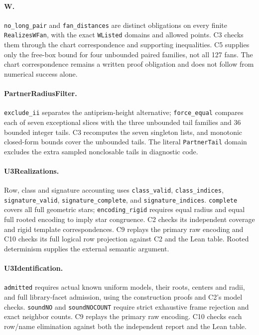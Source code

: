 \documentclass[11pt]{article}
\theoremstyle{definition}
\theoremstyle{remark}
\begin{document}
\paragraph{W.}
\texttt{no\_long\_pair} and \texttt{fan\_distances} are distinct
obligations on every finite \texttt{RealizesWFan}, with the exact
\texttt{WListed} domains and allowed points. C3 checks them through the
chart correspondence and supporting inequalities. C5 supplies only the
free-box bound for four unbounded paired families, not all 127 fans.
The chart correspondence remains a written proof obligation and does not
follow from numerical success alone.

\paragraph{PartnerRadiusFilter.}
\texttt{exclude\_ii} separates the antiprism-height alternative;
\texttt{force\_equal} compares each of seven exceptional slices with the
three unbounded tail families and 36 bounded integer tails. C3 recomputes
the seven singleton lists, and monotonic closed-form bounds cover the
unbounded tails. The literal \texttt{PartnerTail} domain excludes the
extra sampled nonclosable tails in diagnostic code.

\paragraph{U3Realizations.}
Row, class and signature accounting uses \texttt{class\_valid},
\texttt{class\_indices}, \texttt{signature\_valid},
\texttt{signature\_complete}, and \texttt{signature\_indices}.
\texttt{complete} covers all full geometric stars;
\texttt{encoding\_rigid} requires equal radius and equal full rooted
encoding to imply star congruence. C2 checks its independent coverage and
rigid template correspondences. C9 replays the primary raw encoding
and C10 checks its full logical row projection against C2 and the Lean table. Rooted determinism supplies the external semantic argument.

\paragraph{U3Identification.}
\texttt{admitted} requires actual known uniform models, their roots,
centers and radii, and full library-facet admission, using the construction
proofs and C2's model checks. \texttt{soundNO} and \texttt{soundNOCOUNT}
require strict exhaustive frame rejection and exact neighbor counts.
C9 replays the primary raw encoding. C10 checks each row/name elimination
against both the independent report and the Lean table.
\end{document}
